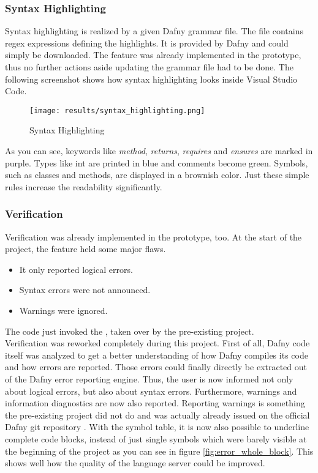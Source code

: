\subsubsection{Syntax Highlighting}
\label{section:result:syntaxhighgliht}
Syntax highlighting is realized by a given Dafny grammar file.
The file contains regex expressions defining the highlights.
It is provided by Dafny  and could simply be downloaded.
The feature was already implemented in the prototype, thus no further actions aside updating the grammar file had to be done.
The following screenshot shows how syntax highlighting looks inside Visual Studio Code.

\begin{figure}[H]
    \centering
    \texttt{[image: results/syntax\_highlighting.png]}
    \caption{Syntax Highlighting}
    \label{fig:result_syntax_highlight}
\end{figure}

As you can see, keywords like \textit{method}, \textit{returns}, \textit{requires} and \textit{ensures} are marked in purple.
Types like int are printed in blue and comments become green.
Symbols, such as classes and methods, are displayed in a brownish color.
Just these simple rules increase the readability significantly.

\subsubsection{Verification}
Verification was already implemented in the prototype, too.
At the start of the project, the feature held some major flaws.
\begin{itemize}
    \item It only reported logical errors.
    \item Syntax errors were not announced.
    \item Warnings were ignored.
\end{itemize}

The code just invoked the , taken over by the pre-existing project.\\

Verification was reworked completely during this project.
First of all, Dafny code itself was analyzed to get a better understanding of how Dafny compiles its code and how errors are reported.
Those errors could finally directly be extracted out of the Dafny error reporting engine.
Thus, the user is now informed not only about logical errors, but also about syntax errors.
Furthermore, warnings and information diagnostics are now also reported.
Reporting warnings is something the pre-existing project did not do and was actually already issued on the official Dafny git repository \cite{dafny_noWarnings}.
With the symbol table, it is now also possible to underline complete code blocks,
instead of just single symbols which were barely visible at the beginning of the project as you can see in figure \ref{fig:error_whole_block}.
This shows well how the quality of the language server could be improved.

